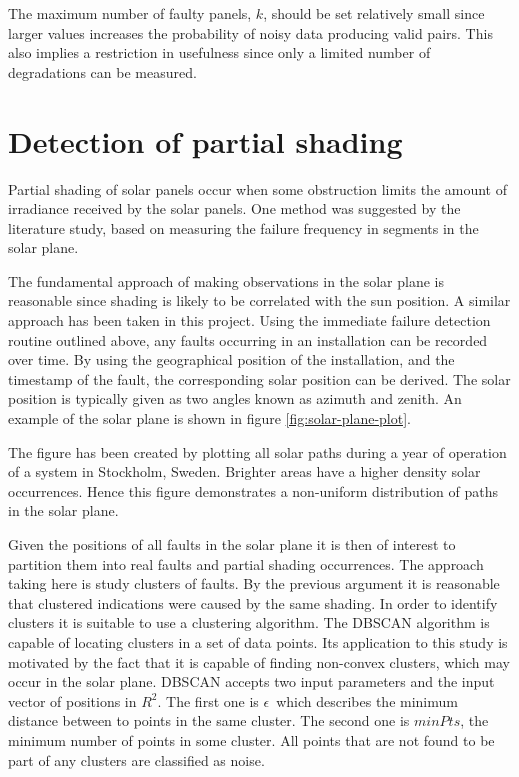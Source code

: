The maximum number of faulty panels, $k$, should be set relatively small since larger values increases the probability of noisy data producing valid pairs.
This also implies a restriction in usefulness since only a limited number of degradations can be measured.

\section{Detection of partial shading}
Partial shading of solar panels occur when some obstruction limits the amount of irradiance received by the solar panels.
One method was suggested by the literature study, based on measuring the failure frequency in segments in the solar plane.

The fundamental approach of making observations in the solar plane is reasonable since shading is likely to be correlated with the sun position.
A similar approach has been taken in this project.
Using the immediate failure detection routine outlined above, any faults occurring in an installation can be recorded over time.
By using the geographical position of the installation, and the timestamp of the fault, the corresponding solar position can be derived.
The solar position is typically given as two angles known as azimuth and zenith.
An example of the solar plane is shown in figure \ref{fig:solar-plane-plot}.


The figure has been created by plotting all solar paths during a year of operation of a system in Stockholm, Sweden.
Brighter areas have a higher density solar occurrences.
Hence this figure demonstrates a non-uniform distribution of paths in the solar plane.

Given the positions of all faults in the solar plane it is then of interest to partition them into real faults and partial shading occurrences.
The approach taking here is study clusters of faults.
By the previous argument it is reasonable that clustered indications were caused by the same shading.
In order to identify clusters it is suitable to use a clustering algorithm.
The DBSCAN algorithm \cite{Birant2007} is capable of locating clusters in a set of data points.
Its application to this study is motivated by the fact that it is capable of finding non-convex clusters, which may occur in the solar plane.
DBSCAN accepts two input parameters and the input vector of positions in $R^2$.
The first one is $\epsilon$ which describes the minimum distance between to points in the same cluster.
The second one is $minPts$, the minimum number of points in some cluster.
All points that are not found to be part of any clusters are classified as noise.

